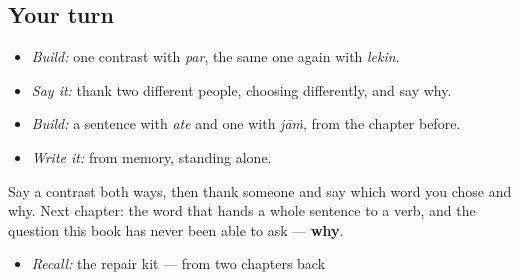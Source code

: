 \subsection*{Your turn}
\begin{itemize}
\raggedright
  \item \emph{Build:} one contrast with \emph{par}, the same one again with \emph{lekin}.
  \item \emph{Say it:} thank two different people, choosing differently, and say why.
  \item \emph{Build:} a sentence with \emph{ate} and one with \emph{jāṁ}, from the chapter before.
  \item \emph{Write it:} \textbf{} from memory, standing alone.
\end{itemize}

\begin{tcolorbox}[breakable,colback=teal!4,colframe=teal!35!black,title={Before you move on}]
Say a contrast both ways, then thank someone and say which word you chose and why. Next chapter: the word that hands a whole sentence to a verb, and the question this book has never been able to ask — \textbf{why}.

\begin{itemize}
\raggedright
  \item \emph{Recall:} the repair kit — from two chapters back
\end{itemize}
\end{tcolorbox}

